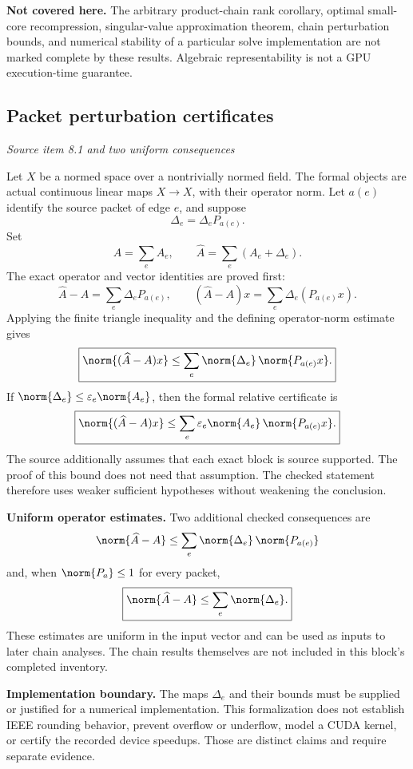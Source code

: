 \textbf{Not covered here.} The arbitrary product-chain rank corollary, optimal small-core recompression, singular-value approximation theorem, chain perturbation bounds, and numerical stability of a particular solve implementation are not marked complete by these results. Algebraic representability is not a GPU execution-time guarantee.



\subsection{Packet perturbation certificates}\label{supp1:subsection:004}\textit{Source item 8.1 and two uniform consequences}\par
Let $X$ be a normed space over a nontrivially normed field. The formal objects are actual continuous linear maps $X\to X$, with their operator norm. Let $a(e)$ identify the source packet of edge $e$, and suppose
\[
\Delta_e=\Delta_e P_{a(e)}.
\]
Set
\[
A=\sum_e A_e,\qquad \widehat A=\sum_e(A_e+\Delta_e).
\]
The exact operator and vector identities are proved first:
\[
\widehat A-A=\sum_e\Delta_e P_{a(e)},\qquad
(\widehat A-A)x=\sum_e\Delta_e(P_{a(e)}x).
\]
Applying the finite triangle inequality and the defining operator-norm estimate gives
\[
\boxed{
\norm{(\widehat A-A)x}
\le\sum_e\norm{\Delta_e}\,\norm{P_{a(e)}x}.
}
\]
If $\norm{\Delta_e}\le\varepsilon_e\norm{A_e}$, then the formal relative certificate is
\[
\boxed{
\norm{(\widehat A-A)x}
\le\sum_e\varepsilon_e\norm{A_e}\,\norm{P_{a(e)}x}.
}
\]
The source additionally assumes that each exact block is source supported. The proof of this bound does not need that assumption. The checked statement therefore uses weaker sufficient hypotheses without weakening the conclusion.

\textbf{Uniform operator estimates.} Two additional checked consequences are
\[
\norm{\widehat A-A}
\le\sum_e\norm{\Delta_e}\,\norm{P_{a(e)}}
\]
and, when $\norm{P_a}\le1$ for every packet,
\[
\boxed{\norm{\widehat A-A}\le\sum_e\norm{\Delta_e}.}
\]
These estimates are uniform in the input vector and can be used as inputs to later chain analyses. The chain results themselves are not included in this block's completed inventory.

\textbf{Implementation boundary.} The maps $\Delta_e$ and their bounds must be supplied or justified for a numerical implementation. This formalization does not establish IEEE rounding behavior, prevent overflow or underflow, model a CUDA kernel, or certify the recorded device speedups. Those are distinct claims and require separate evidence.



